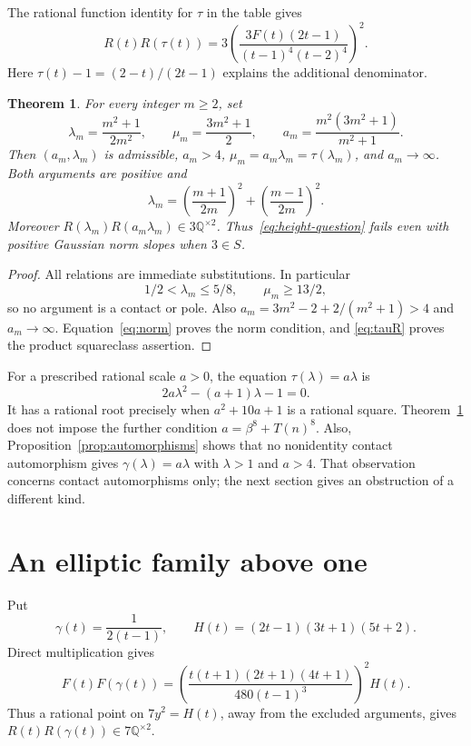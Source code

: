 \documentclass[11pt,a4paper]{article}
\newtheorem{theorem}{Theorem}[section]
\newcommand{\Q}{\mathbb Q}\newcommand{\Z}{\mathbb Z}
\begin{document}
The rational function identity for $\tau$ in the table gives
\begin{equation}\label{eq:tauR}
 R(t)R(\tau(t))
 =3\left(\frac{3F(t)(2t-1)}{(t-1)^4(t-2)^4}\right)^2.
\end{equation}
Here $\tau(t)-1=(2-t)/(2t-1)$ explains the additional denominator.

\begin{theorem}\label{thm:positive}
For every integer $m\ge2$, set
\[
 \lambda_m=\frac{m^2+1}{2m^2},\qquad
 \mu_m=\frac{3m^2+1}{2},\qquad
 a_m=\frac{m^2(3m^2+1)}{m^2+1}.
\]
Then $(a_m,\lambda_m)$ is admissible, $a_m>4$,
$\mu_m=a_m\lambda_m=\tau(\lambda_m)$, and $a_m\to\infty$.
Both arguments are positive and
\begin{equation}\label{eq:norm}
 \lambda_m=\left(\frac{m+1}{2m}\right)^2+
              \left(\frac{m-1}{2m}\right)^2.
\end{equation}
Moreover $R(\lambda_m)R(a_m\lambda_m)\in3\Q^{\times2}$.
Thus~\eqref{eq:height-question} fails even with positive Gaussian
norm slopes when $3\in S$.
\end{theorem}
\begin{proof}
All relations are immediate substitutions. In particular
\[
 1/2<\lambda_m\le5/8,\qquad \mu_m\ge13/2,
\]
so no argument is a contact or pole. Also
$a_m=3m^2-2+2/(m^2+1)>4$ and $a_m\to\infty$.
Equation~\eqref{eq:norm} proves the norm condition, and
\eqref{eq:tauR} proves the product squareclass assertion.
\end{proof}

For a prescribed rational scale $a>0$, the equation
$\tau(\lambda)=a\lambda$ is
\[
                   2a\lambda^2-(a+1)\lambda-1=0.
\]
It has a rational root precisely when $a^2+10a+1$ is a rational
square. Theorem~\ref{thm:positive} does not impose the further
condition $a=\beta^8+T(n)^8$. Also, Proposition~\ref{prop:automorphisms}
shows that no nonidentity contact automorphism gives
$\gamma(\lambda)=a\lambda$ with $\lambda>1$ and $a>4$.
That observation concerns contact automorphisms only; the next section
gives an obstruction of a different kind.

\section{An elliptic family above one}

Put
\[
 \gamma(t)=\frac1{2(t-1)},\qquad
 H(t)=(2t-1)(3t+1)(5t+2).
\]
Direct multiplication gives
\begin{equation}\label{eq:elliptic-product}
 F(t)F(\gamma(t))=
 \left(\frac{t(t+1)(2t+1)(4t+1)}{480(t-1)^3}\right)^2H(t).
\end{equation}
Thus a rational point on $7y^2=H(t)$, away from the excluded
arguments, gives $R(t)R(\gamma(t))\in7\Q^{\times2}$.
\end{document}
